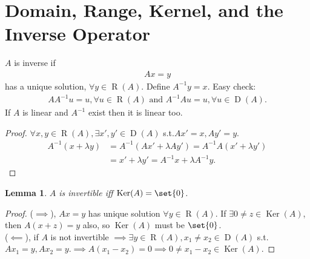 \documentclass[a4paper]{book}
\newtheorem{lemma}[thm]{Lemma}
\DeclarePairedDelimiter{\set}\lbrace\rbrace
\DeclareMathOperator{\Ker}{Ker}
\DeclareMathOperator{\domain}{D}
\DeclareMathOperator{\range}{R}
\begin{document}
\section{Domain, Range, Kernel, and the Inverse Operator}
\begin{myDef}[inverse]
    $A$ is inverse if
    \begin{gather*}
        Ax = y
    \end{gather*}
    has a unique solution, $\forall y \in \range(A)$. Define $A^{-1}y=x$. Easy check:
    \begin{gather*}
        AA^{-1}u=u, \forall u \in \range(A) \text{ and } A^{-1}Au=u, \forall u \in \domain(A).
    \end{gather*}
    If $A$ is linear and $A^{-1}$ exist then it is linear too.
\end{myDef}
\begin{proof}
    $\forall x,y \in \range(A), \exists x', y' \in \domain(A)$ s.t.$Ax'=x, Ay'=y$.
    \begin{align*}
        A^{-1}(x+\lambda y) & =A^{-1}(Ax'+\lambda Ay')=A^{-1}A(x'+\lambda y') \\
                            & =x'+\lambda y'=A^{-1}x+\lambda A^{-1}y.
    \end{align*}
\end{proof}
\begin{lemma}\label{A_invertible_iff_kerA=0}
    $A$ is invertible iff $\Ker (A) = \set{0}$.
\end{lemma}
\begin{proof}
    ($\implies$), $Ax=y$ has unique solution $\forall y \in \range(A)$.
    If $\exists 0 \neq z \in \Ker(A)$, then $A(x+z)=y$ also, so $\Ker(A)$ must be $\set{0}$.\\
    ($\impliedby$), if $A$ is not invertible
    $\implies \exists y \in \range(A), x_1 \neq x_2 \in \domain(A)$ s.t.
    $Ax_1=y, Ax_2=y. \implies A(x_1-x_2)=0 \implies 0 \neq x_1-x_2 \in \Ker(A)$.
\end{proof}
\end{document}
